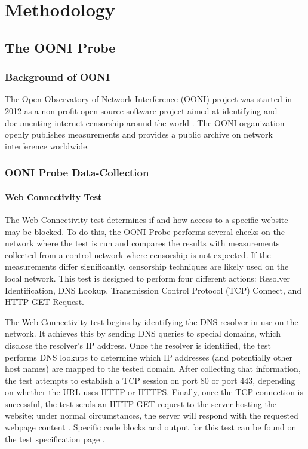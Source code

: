 \chapter{Methodology}

\section{The OONI Probe}

\subsection{Background of OONI}

The Open Observatory of Network Interference (OONI) project was started in 2012 as a non-profit open-source software project aimed at identifying and documenting internet censorship around the world \cite{ooniAbout}. The OONI organization openly publishes measurements and provides a public archive on network interference worldwide. 

\subsection{OONI Probe Data-Collection}

\subsubsection{Web Connectivity Test}

The Web Connectivity test determines if and how access to a specific website may be blocked. To do this, the OONI Probe performs several checks on the network where the test is run and compares the results with measurements collected from a control network where censorship is not expected. If the measurements differ significantly, censorship techniques are likely used on the local network. This test is designed to perform four different actions: Resolver Identification, DNS Lookup, Transmission Control Protocol (TCP) Connect, and HTTP GET Request.

The Web Connectivity test begins by identifying the DNS resolver in use on the network. It achieves this by sending DNS queries to special domains, which disclose the resolver’s IP address. Once the resolver is identified, the test performs DNS lookups to determine which IP addresses (and potentially other host names) are mapped to the tested domain. After collecting that information, the test attempts to establish a TCP session on port 80 or port 443, depending on whether the URL uses HTTP or HTTPS. Finally, once the TCP connection is successful, the test sends an HTTP GET request to the server hosting the website; under normal circumstances, the server will respond with the requested webpage content \cite{ooniConnectivityTest}. Specific code blocks and output for this test can be found on the test specification page \cite{OONIWebConnectivityTestGitHub}.

